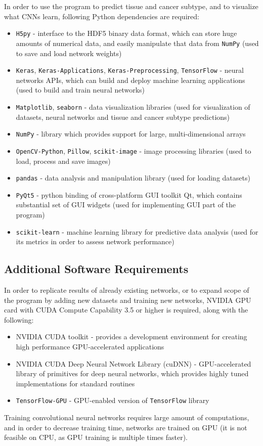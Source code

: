 In order to use the program to predict tissue and cancer subtype, and to visualize what CNNs learn, following Python dependencies are required: 
\begin{itemize}
	\itemsep 0em
	\item \texttt{H5py} - interface to the HDF5 binary data format, which can store huge amounts of numerical data, and easily manipulate that data from \texttt{NumPy} (used to save and load network weights)
	\item \texttt{Keras}, \texttt{Keras-Applications}, \texttt{Keras-Preprocessing}, \texttt{TensorFlow} - neural networks APIs, which can build and deploy machine learning applications (used to build and train neural networks)
	\item \texttt{Matplotlib}, \texttt{seaborn} - data visualization libraries (used for visualization of datasets, neural networks and tissue and cancer subtype predictions)
	\item \texttt{NumPy} - library which provides support for large, multi-dimensional arrays
	\item \texttt{OpenCV-Python}, \texttt{Pillow}, \texttt{scikit-image} - image processing libraries (used to load, process and save images)
	\item \texttt{pandas} - data analysis and manipulation library (used for loading datasets)
	\item \texttt{PyQt5} - python binding of cross-platform GUI toolkit Qt, which contains substantial set of GUI widgets (used for implementing GUI part of the program)
	\item \texttt{scikit-learn} - machine learning library for predictive data analysis (used for its metrics in order to assess network performance)
\end{itemize}

\subsection{Additional Software Requirements}

In order to replicate results of already existing networks, or to expand scope of the program by adding new datasets and training new networks, NVIDIA GPU card with CUDA Compute Capability 3.5 or higher is required, along with the following:
\begin{itemize}
	\itemsep 0em
	\item NVIDIA CUDA toolkit - provides a development environment for creating high performance GPU-accelerated applications
	\item NVIDIA CUDA Deep Neural Network Library (cuDNN) - GPU-accelerated library of primitives for deep neural networks, which provides highly tuned implementations for standard routines
	\item \texttt{TensorFlow-GPU} - GPU-enabled version of \texttt{TensorFlow} library
\end{itemize}
Training convolutional neural networks requires large amount of computations, and in order to decrease training time, networks are trained on GPU (it is not feasible on CPU, as GPU training is multiple times faster).

